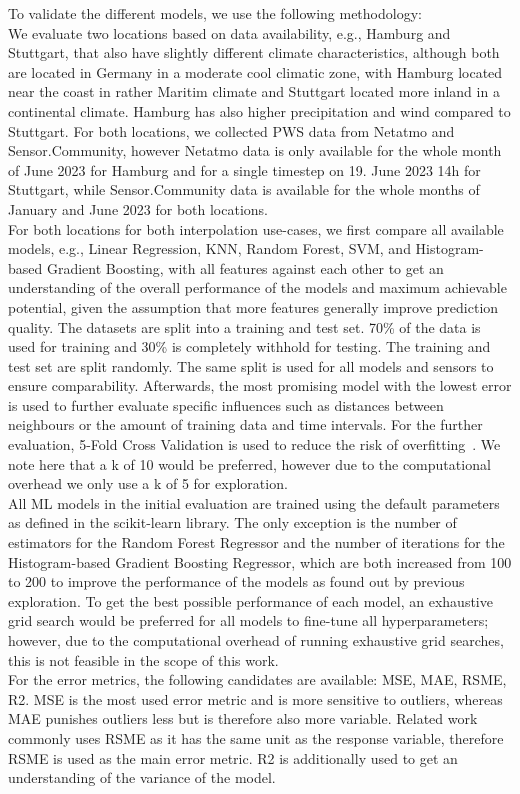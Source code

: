 To validate the different models, we use the following methodology:\\
We evaluate two locations based on data availability, e.g., Hamburg and Stuttgart, that also have slightly different climate characteristics, although both are located in Germany in a moderate cool climatic zone, with Hamburg located near the coast in rather Maritim climate and Stuttgart located more inland in a continental climate. Hamburg has also higher precipitation and wind compared to Stuttgart.
For both locations, we collected PWS data from Netatmo and Sensor.Community, however Netatmo data is only available for the whole month of June 2023 for Hamburg and for a single timestep on 19. June 2023 14h for Stuttgart, while Sensor.Community data is available for the whole months of January and June 2023 for both locations.\\
For both locations for both interpolation use-cases, we first compare all available models, e.g., Linear Regression, KNN, Random Forest, SVM, and Histogram-based Gradient Boosting, with all features against each other to get an understanding of the overall performance of the models and maximum achievable potential, given the assumption that more features generally improve prediction quality. The datasets are split into a training and test set. 70\% of the data is used for training and 30\% is completely withhold for testing. The training and test set are split randomly. The same split is used for all models and sensors to ensure comparability.
Afterwards, the most promising model with the lowest error is used to further evaluate specific influences such as distances between neighbours or the amount of training data and time intervals. For the further evaluation, 5-Fold Cross Validation is used to reduce the risk of overfitting~\cite{kohavi1995study}. We note here that a k of 10 would be preferred, however due to the computational overhead we only use a k of 5 for exploration.\\
All ML models in the initial evaluation are trained using the default parameters as defined in the scikit-learn library. The only exception is the number of estimators for the Random Forest Regressor and the number of iterations for the Histogram-based Gradient Boosting Regressor, which are both increased from 100 to 200 to improve the performance of the models as found out by previous exploration. To get the best possible performance of each model, an exhaustive grid search would be preferred for all models to fine-tune all hyperparameters; however, due to the computational overhead of running exhaustive grid searches, this is not feasible in the scope of this work.\\
For the error metrics, the following candidates are available: MSE, MAE, RSME, R2. MSE is the most used error metric and is more sensitive to outliers, whereas MAE punishes outliers less but is therefore also more variable. Related work commonly uses RSME as it has the same unit as the response variable, therefore RSME is used as the main error metric. R2 is additionally used to get an understanding of the variance of the model.

